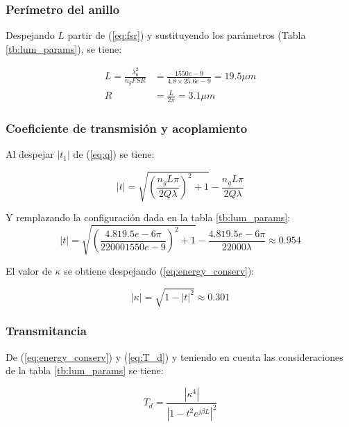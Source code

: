 \subsubsection{Perímetro del anillo}

Despejando $L$ partir de (\ref{eq:fsr}) y sustituyendo los parámetros 
(Tabla \ref{tb:lum_params}), se tiene:

\begin{align*}
L=\frac{\lambda_0^2}{n_g FSR} 
&=\frac{1550e-9}{4.8 \times 25.6e-9}
 =19.5 \mu m  \\ %
R &= \frac{L}{2 \pi} = 3.1 \mu m  %
\end{align*}

\subsubsection{Coeficiente de transmisión y acoplamiento} 

Al despejar $|t_1|$ de (\ref{eq:q}) se tiene:

\begin{equation}
|t|=\sqrt{ \left( \frac{n_g L \pi}{2 Q \lambda} \right) ^2 + 1} - 
    \frac{n_g L \pi}{2 Q \lambda}
\label{eq:t}
\end{equation} 

Y remplazando la configuración dada en la tabla \ref{tb:lum_params}:
\begin{equation*}
|t|=\sqrt{ \left( \frac{4.8 19.5e-6 \pi}{2 2000 1550e-9} \right) ^2 + 1} - 
    \frac{4.8 19.5e-6 \pi}{2 2000 \lambda}
   \approx 0.954
\label{eq:lum_t}
\end{equation*}

El valor de $\kappa$ se obtiene despejando (\ref{eq:energy_conserv}):

\begin{equation}
|\kappa|=\sqrt{1 - |t|^2} \approx 0.301
\label{eq:lum_k}
\end{equation} 

\subsubsection{Transmitancia}

De (\ref{eq:energy_conserv}) y (\ref{eq:T_d}) y teniendo en cuenta 
las consideraciones de la tabla \ref{tb:lum_params} se tiene:

\begin{equation}
T_d=\frac{|\kappa^4|}{|1 - t^2 e^{j \beta L}|^2}
\label{eq:lum_Td}
\end{equation} 
